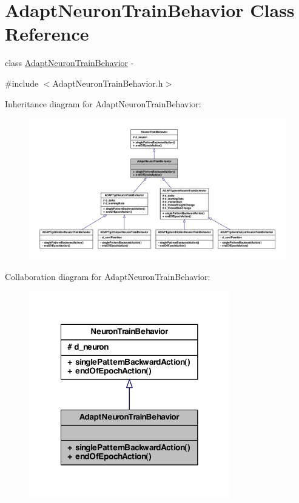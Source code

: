 \hypertarget{class_adapt_neuron_train_behavior}{
\section{AdaptNeuronTrainBehavior Class Reference}
\label{class_adapt_neuron_train_behavior}
}


class \hyperlink{class_adapt_neuron_train_behavior}{AdaptNeuronTrainBehavior} -\/  




{\ttfamily \#include $<$AdaptNeuronTrainBehavior.h$>$}



Inheritance diagram for AdaptNeuronTrainBehavior:
\nopagebreak
\begin{figure}[H]
\begin{center}
\leavevmode
\includegraphics[width=400pt]{class_adapt_neuron_train_behavior__inherit__graph}
\end{center}
\end{figure}


Collaboration diagram for AdaptNeuronTrainBehavior:\nopagebreak
\begin{figure}[H]
\begin{center}
\leavevmode
\includegraphics[width=248pt]{class_adapt_neuron_train_behavior__coll__graph}
\end{center}
\end{figure}
